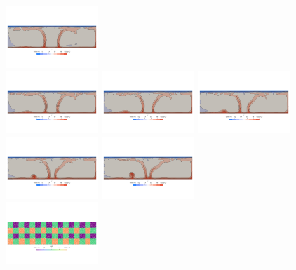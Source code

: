 \begin{center}
\includegraphics[width=3.5cm]{python_codes/fieldstone_88/results/model3/T0014.png}\\
\includegraphics[width=3.5cm]{python_codes/fieldstone_88/results/model3/T0015.png}
\includegraphics[width=3.5cm]{python_codes/fieldstone_88/results/model3/T0016.png}
\includegraphics[width=3.5cm]{python_codes/fieldstone_88/results/model3/T0017.png}
\includegraphics[width=3.5cm]{python_codes/fieldstone_88/results/model3/T0018.png}
\includegraphics[width=3.5cm]{python_codes/fieldstone_88/results/model3/T0019.png}\\
\includegraphics[width=3.5cm]{python_codes/fieldstone_88/results/model3/m0000.png}

\end{center}

